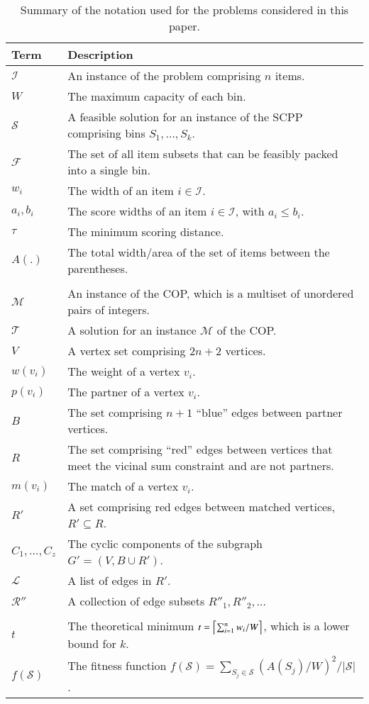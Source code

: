 \documentclass[a4paper,11pt,authoryear]{elsarticle}
\DeclarePairedDelimiter{\ceil}{\lceil}{\rceil}
\begin{document}
\begin{table}[h]
\centering
\caption{Summary of the notation used for the problems considered in this paper.}
\footnotesize
\begin{tabular}{l p{12cm}}
	\toprule
	Term & Description \\
	\midrule
	$\mathcal{I}$ & An instance of the problem comprising $n$ items. \\
	$W$ & The maximum capacity of each bin.\\
	$\mathcal{S}$ & A feasible solution for an instance of the SCPP comprising bins $S_1,\dotsc,S_k$.\\
	$\mathcal{F}$ & The set of all item subsets that can be feasibly packed into a single bin.\\
	$w_i$ & The width of an item $i \in \mathcal{I}$.\\
	$a_i, b_i$ & The score widths of an item $i \in \mathcal{I}$, with $a_i \leq b_i$.\\
	$\tau$ & The minimum scoring distance.\\
	$A(.)$ & The total width/area of the set of items between the parentheses.\\
	& \\
	$\mathcal{M}$ & An instance of the COP, which is a multiset of unordered pairs of integers.\\
	$\mathcal{T}$ & A solution for an instance $\mathcal{M}$ of the COP.\\
	$V$ & A vertex set comprising $2n+2$ vertices.\\
	$w(v_i)$ & The weight of a vertex $v_i$.\\
	$p(v_i)$ & The partner of a vertex $v_i$.\\
	$B$ & The set comprising $n+1$ ``blue'' edges between partner vertices.\\
	$R$ & The set comprising ``red'' edges between vertices that meet the vicinal sum constraint and are not partners.\\
	$m(v_i)$ & The match of a vertex $v_i$.\\
	$R'$ & A set comprising red edges between matched vertices, $R' \subseteq R$.\\
	$C_1,\dotsc,C_z$ & The cyclic components of the subgraph $G' =(V, B \cup R')$.\\
	$\mathcal{L}$ & A list of edges in $R'$.\\
	$\mathcal{R}''$ & A collection of edge subsets $R''_1, R''_2,\dots$\\
	& \\
	$t$ & The theoretical minimum $t = \ceil*{\sum_{i=1}^{n} w_i / W}$, which is a lower bound for $k$.\\
	$f(\mathcal{S})$ & The fitness function $f(\mathcal{S}) = \sum_{S_j \in \mathcal{S}} (A(S_j)/W)^2 / |\mathcal{S}|$.\\
	\bottomrule
\end{tabular}	
\label{table:notation}
\end{table}
\end{document}
